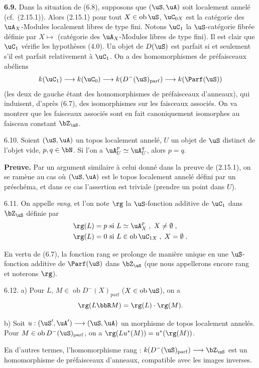 \bigskip
\noindent\textbf{6.9.} Dans la situation de (6.8), supposons que $(\uS,\uA)$ soit localement annel\'{e} (cf.~(2.15.1)). Alors (2.15.1) pour tout $X \in \operatorname{ob} \uS$, $\uC_{0X}$ est la cat\'{e}gorie des $\uA_X$-Modules localement libres de type fini. Notons $\uC_1$ la $\uS$-cat\'{e}gorie fibr\'{e}e d\'{e}finie par $X \longmapsto$ (cat\'{e}gorie des $\uA_X$-Modules libres de type fini). Il est clair que $\uC_1$ v\'{e}rifie les hypoth\`{e}ses (4.0). Un objet de $D(\uS)$ est parfait si et seulement s'il est parfait relativement \`{a} $\uC_1$. On a des homomorphismes de pr\'{e}faisceaux ab\'{e}liens
\[
k(\uC_1) \longrightarrow k(\uC_0) \longrightarrow k(D^-(\uS)_{\mathrm{parf}}) \longrightarrow k(\Parf(\uS))
\]
(les deux de gauche \'{e}tant des homomorphismes de pr\'{e}faisceaux d'anneaux), qui induisent, d'apr\`{e}s (6.7), des isomorphismes sur les faisceaux associ\'{e}s. On va montrer que les faisceaux associ\'{e}s sont en fait canoniquement isomorphes au faisceau constant $\bZ_{\uS}$.

\begin{lemme} 6.10.
Soient $(\uS,\uA)$ un topos localement annel\'{e}, $U$ un objet de $\uS$ distinct de l'objet vide, $p, q \in \bN$. Si l'on a $\uA_U^p \simeq \uA_U^q$, alors $p = q$.
\end{lemme}

\noindent\textbf{Preuve.} Par un argument similaire \`{a} celui donn\'{e} dans la preuve de (2.15.1), on se ram\`{e}ne au cas o\`{u} $(\uS,\uA)$ est le topos localement annel\'{e} d\'{e}fini par un pr\'{e}sch\'{e}ma, et dans ce cas l'assertion est triviale (prendre un point dans $U$).

\begin{definition} 6.11.
On appelle \emph{rang}, et l'on note $\rg$ la $\uS$-fonction additive de $\uC_1$ dans $\bZ_{\uS}$ d\'{e}finie par
\begin{align*}
\rg(L) &= p \text{ si } L \simeq \uA_X^p \; , \; X \neq \emptyset \; , \\
\rg(L) &= 0 \text{ si } L \in \operatorname{ob} \uC_{1X} \; , \; X = \emptyset \; .
\end{align*}
\end{definition}

En vertu de (6.7), la fonction rang se prolonge de mani\`{e}re unique en une $\uS$-fonction additive de $\Parf(\uS)$ dans $\bZ_{\uS}$ (que nous appellerons encore rang et noterons $\rg$).

\begin{proposition} 6.12.
a) Pour $L$, $M \in \operatorname{ob} D^-(X)_{\mathrm{parf}}$ ($X \in \operatorname{ob} \uS$), on a
\[
\rg(L \bbR M) = \rg(L) \cdot \rg(M) .
\]

b) Soit $u : (\uS',\uA') \longrightarrow (\uS,\uA)$ un morphisme de topos localement annel\'{e}s. Pour $M \in \operatorname{ob} D^-(\uS)_{\mathrm{parf}}$, on a $\rg(Lu^*(M)) = u^*(\rg(M))$.

En d'autres termes, l'homomorphisme rang : $k(D^-(\uS)_{\mathrm{parf}}) \longrightarrow \bZ_{\uS}$ est un homomorphisme de pr\'{e}faisceaux d'anneaux, compatible avec les images inverses.
\end{proposition}

